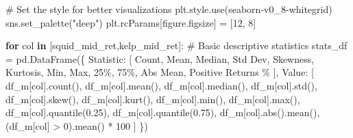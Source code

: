\documentclass[
  letterpaper,
  DIV=11,
  numbers=noendperiod]{scrartcl}
\newenvironment{Shaded}{\begin{snugshade}}{\end{snugshade}}
\newcommand{\BuiltInTok}[1]{\textcolor[rgb]{0.00,0.23,0.31}{#1}}
\newcommand{\CommentTok}[1]{\textcolor[rgb]{0.37,0.37,0.37}{#1}}
\newcommand{\ControlFlowTok}[1]{\textcolor[rgb]{0.00,0.23,0.31}{\textbf{#1}}}
\newcommand{\DecValTok}[1]{\textcolor[rgb]{0.68,0.00,0.00}{#1}}
\newcommand{\FloatTok}[1]{\textcolor[rgb]{0.68,0.00,0.00}{#1}}
\newcommand{\KeywordTok}[1]{\textcolor[rgb]{0.00,0.23,0.31}{\textbf{#1}}}
\newcommand{\NormalTok}[1]{\textcolor[rgb]{0.00,0.23,0.31}{#1}}
\newcommand{\OperatorTok}[1]{\textcolor[rgb]{0.37,0.37,0.37}{#1}}
\newcommand{\StringTok}[1]{\textcolor[rgb]{0.13,0.47,0.30}{#1}}
\begin{document}
\begin{Shaded}
\begin{Highlighting}[]
\CommentTok{\# Set the style for better visualizations}
\NormalTok{plt.style.use(}\StringTok{\textquotesingle{}seaborn{-}v0\_8{-}whitegrid\textquotesingle{}}\NormalTok{)}
\NormalTok{sns.set\_palette(}\StringTok{"deep"}\NormalTok{)}
\NormalTok{plt.rcParams[}\StringTok{\textquotesingle{}figure.figsize\textquotesingle{}}\NormalTok{] }\OperatorTok{=}\NormalTok{ [}\DecValTok{12}\NormalTok{, }\DecValTok{8}\NormalTok{]}
\end{Highlighting}
\end{Shaded}

\begin{Shaded}
\begin{Highlighting}[]
\ControlFlowTok{for}\NormalTok{ col }\KeywordTok{in}\NormalTok{ [}\StringTok{\textquotesingle{}squid\_mid\_ret\textquotesingle{}}\NormalTok{,}\StringTok{\textquotesingle{}kelp\_mid\_ret\textquotesingle{}}\NormalTok{]:}
    \CommentTok{\# Basic descriptive statistics}
\NormalTok{    stats\_df }\OperatorTok{=}\NormalTok{ pd.DataFrame(\{}
        \StringTok{\textquotesingle{}Statistic\textquotesingle{}}\NormalTok{: [}
            \StringTok{\textquotesingle{}Count\textquotesingle{}}\NormalTok{, }\StringTok{\textquotesingle{}Mean\textquotesingle{}}\NormalTok{, }\StringTok{\textquotesingle{}Median\textquotesingle{}}\NormalTok{, }\StringTok{\textquotesingle{}Std Dev\textquotesingle{}}\NormalTok{, }\StringTok{\textquotesingle{}Skewness\textquotesingle{}}\NormalTok{, }\StringTok{\textquotesingle{}Kurtosis\textquotesingle{}}\NormalTok{,}
            \StringTok{\textquotesingle{}Min\textquotesingle{}}\NormalTok{, }\StringTok{\textquotesingle{}Max\textquotesingle{}}\NormalTok{, }\StringTok{\textquotesingle{}25\%\textquotesingle{}}\NormalTok{, }\StringTok{\textquotesingle{}75\%\textquotesingle{}}\NormalTok{, }\StringTok{\textquotesingle{}Abs Mean\textquotesingle{}}\NormalTok{, }\StringTok{\textquotesingle{}Positive Returns \%\textquotesingle{}}
\NormalTok{        ],}
        \StringTok{\textquotesingle{}Value\textquotesingle{}}\NormalTok{: [}
\NormalTok{            df\_m[col].count(),}
\NormalTok{            df\_m[col].mean(),}
\NormalTok{            df\_m[col].median(),}
\NormalTok{            df\_m[col].std(),}
\NormalTok{            df\_m[col].skew(),}
\NormalTok{            df\_m[col].kurt(),}
\NormalTok{            df\_m[col].}\BuiltInTok{min}\NormalTok{(),}
\NormalTok{            df\_m[col].}\BuiltInTok{max}\NormalTok{(),}
\NormalTok{            df\_m[col].quantile(}\FloatTok{0.25}\NormalTok{),}
\NormalTok{            df\_m[col].quantile(}\FloatTok{0.75}\NormalTok{),}
\NormalTok{            df\_m[col].}\BuiltInTok{abs}\NormalTok{().mean(),}
\NormalTok{            (df\_m[col] }\OperatorTok{\textgreater{}} \DecValTok{0}\NormalTok{).mean() }\OperatorTok{*} \DecValTok{100}
\NormalTok{        ]}
\NormalTok{    \})}


\end{Highlighting}
\end{Shaded}
\end{document}
